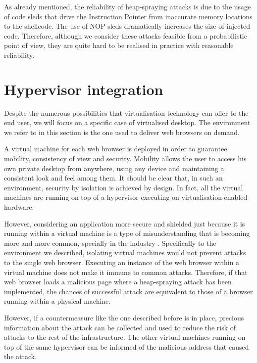 As already mentioned, the reliability of heap-spraying attacks is due to the usage of code sleds that drive the Instruction Pointer from inaccurate memory locations to the shellcode. The use of NOP sleds dramatically increases the size of injected code. Therefore, although we consider these attacks feasible from a probabilistic point of view, they are quite hard to be realised in practice with reasonable reliability.



\section{Hypervisor integration}\label{bub:integration}
Despite the numerous possibilities that virtualisation technology can offer to the end user, we will focus on a specific case of virtualised desktop. The environment we refer to in this section is the one used to deliver web browsers on demand. 

A virtual machine for each web browser is deployed in order to guarantee mobility, consistency of view and security. Mobility allows the user to access his own private desktop from anywhere, using any device and maintaining a consistent look and feel among them. It should be clear that, in such an environment, security by isolation is achieved by design. In fact, all the virtual machines are running on top of a hypervisor executing on virtualisation-enabled hardware.

However, considering an application more secure and shielded just because it is running within a virtual machine is a type of misunderstanding that is becoming more and more common, specially in the industry \cite{virtoverkill}. Specifically to the environment we described, isolating virtual machines would not prevent attacks to the single web browser. Executing an instance of the web browser within a virtual machine does not make it immune to common attacks. Therefore, if that web browser loads a malicious page where a heap-spraying attack has been implemented, the chances of successful attack are equivalent to those of a browser running within a physical machine. 

However, if a countermeasure like the one described before is in place, precious information about the attack can be collected and used to reduce the risk of attacks to the rest of the infrastructure. The other virtual machines running on top of the same hypervisor can be informed of the malicious address that caused the attack. 

